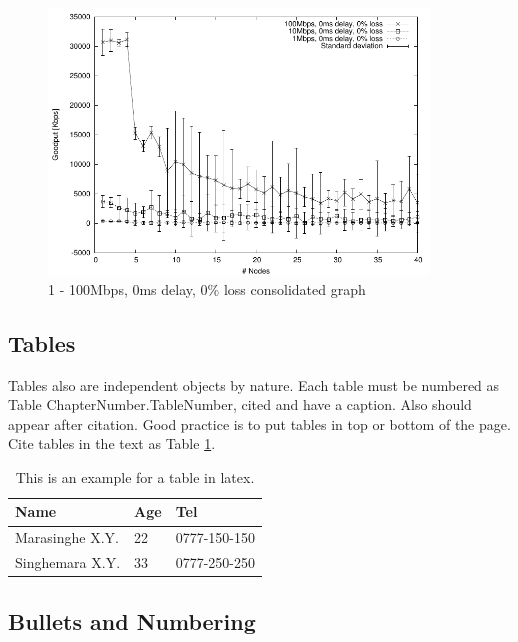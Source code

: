 \begin{figure}[hbt]
        \begin{center}
                \includegraphics[width=0.9\textwidth]{01_chapters/02/figs/1000-100000_0_0.pdf}
        \end{center}
        \caption{1 - 100Mbps, 0ms delay, 0\% loss consolidated graph}
        \label{fig:losscons}
\end{figure}

 
\subsection{Tables}

Tables also are independent objects by nature. Each table must be numbered as Table ChapterNumber.TableNumber, cited and have a caption. Also should appear after citation. Good practice is to put tables in top or bottom of the page. Cite tables in the text as Table \ref{tb:sampletable}.

\begin{table}[tb]
\caption{This is an example for a table in latex.}
\label{tb:sampletable}

\begin{center}
\begin{tabular}{l|l|l}
 Name						&	Age		&	Tel \\
\hline
 Marasinghe X.Y.		& 22			&	0777-150-150\\
 \hline
 Singhemara X.Y.		& 33			&  0777-250-250\\
\end{tabular}
\end{center}
\end{table}


\subsection{Bullets and Numbering}

